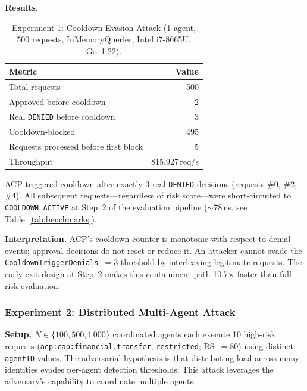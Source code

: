 \documentclass[11pt]{article}
\theoremstyle{definition}
\begin{document}
\textbf{Results.}
\begin{table}[h!]
\centering\small
\begin{tabular}{lr}
\toprule
Metric & Value \\
\midrule
Total requests                        & 500 \\
Approved before cooldown              & 2 \\
Real \texttt{DENIED} before cooldown  & 3 \\
Cooldown-blocked                      & 495 \\
Requests processed before first block & 5 \\
Throughput                            & 815{,}927\,req/s \\
\bottomrule
\end{tabular}
\caption{Experiment 1: Cooldown Evasion Attack (1 agent, 500 requests,
InMemoryQuerier, Intel i7-8665U, Go~1.22).}
\label{tab:adv-exp1}
\end{table}

ACP triggered cooldown after exactly 3 real \texttt{DENIED} decisions (requests
\#0, \#2, \#4). All subsequent requests---regardless of risk score---were
short-circuited to \texttt{COOLDOWN\_ACTIVE} at Step~2 of the evaluation
pipeline ($\sim$78\,ns, see Table~\ref{tab:benchmarks}).

\textbf{Interpretation.}
ACP's cooldown counter is monotonic with respect to denial events; approval
decisions do not reset or reduce it.
An attacker cannot evade the \texttt{CooldownTriggerDenials}~$=3$ threshold by
interleaving legitimate requests.
The early-exit design at Step~2 makes this containment path 10.7$\times$ faster
than full risk evaluation.

\subsubsection*{Experiment 2: Distributed Multi-Agent Attack}

\textbf{Setup.}
$N \in \{100, 500, 1\,000\}$ coordinated agents each execute 10 high-risk
requests (\texttt{acp:cap:financial.transfer}, \texttt{restricted}; RS~$=80$)
using distinct \texttt{agentID} values.
The adversarial hypothesis is that distributing load across many identities
evades per-agent detection thresholds.
This attack leverages the adversary's capability to coordinate multiple agents.
\end{document}
